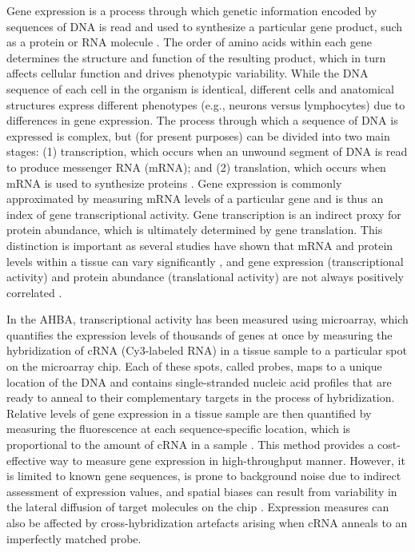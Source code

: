 Gene expression is a process through which genetic information encoded by sequences of DNA is read and used to synthesize a particular gene product, such as a protein or RNA molecule \citep{Szymanski2002}. The order of amino acids within each gene determines the structure and function of the resulting product, which in turn affects cellular function and drives phenotypic variability. While the DNA sequence of each cell in the organism is identical, different cells and anatomical structures express different phenotypes (e.g., neurons versus lymphocytes) due to differences in gene expression. The process through which a sequence of DNA is expressed is complex, but (for present purposes) can be divided into two main stages: (1) transcription, which occurs when an unwound segment of DNA is read to produce messenger RNA (mRNA); and (2) translation, which occurs when mRNA is used to synthesize proteins \citep{Krebs2014}. Gene expression is commonly approximated by measuring mRNA levels of a particular gene and is thus an index of gene transcriptional activity. Gene transcription is an indirect proxy for protein abundance, which is ultimately determined by gene translation. This distinction is important as several studies have shown that mRNA and protein levels within a tissue can vary significantly \citep{Futcher1999,Gygi1999,Greenbaum2003}, and gene expression (transcriptional activity) and protein abundance (translational activity) are not always positively correlated \citep{Margineantu2007,Schwanhausser2011}.

In the AHBA, transcriptional activity has been measured using microarray, which quantifies the expression levels of thousands of genes at once by measuring the hybridization of cRNA (Cy3-labeled RNA) in a tissue sample to a  particular spot on the microarray chip. Each of these spots, called probes, maps to a unique location of the DNA and contains single-stranded nucleic acid profiles that are ready to anneal to their complementary targets in the process of hybridization. Relative levels of gene expression in a tissue sample are then quantified by measuring the fluorescence at each sequence-specific location, which is proportional to the amount of cRNA in a sample \citep{Tarca2006}. This method provides a cost-effective way to measure gene expression in high-throughput manner. However, it is limited to known gene sequences, is prone to background noise due to indirect assessment of expression values, and spatial biases can result from variability in the lateral diffusion of target molecules on the chip \citep{Steger2011}. Expression measures can also be affected by cross-hybridization artefacts arising when cRNA anneals to an imperfectly matched probe.

